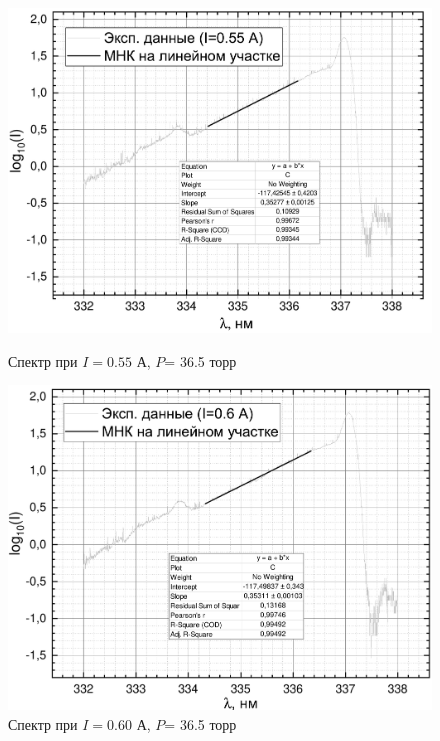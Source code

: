 \begin{figure}[h]
\begin{minipage}{0.45\linewidth}
		\includegraphics[width=\linewidth]{data/graph_I=0,55_polosa}
		\caption{Спектр при $I= 0.55 $ А, $P$= 36.5 торр}
		\label{polosa_55}	
	\end{minipage} 
	\hfill
	\begin{minipage}[H]{0.45\linewidth}
		\centering
		\includegraphics[width=\linewidth]{data/graph_I=0,60_polosa}
		\caption{Спектр при $I= 0.60 $ А, $P$= 36.5 торр}
		\label{polosa_60}
	\end{minipage}
	\begin{minipage}{0.45\linewidth}
		\centering

\end{minipage}
\end{figure}
